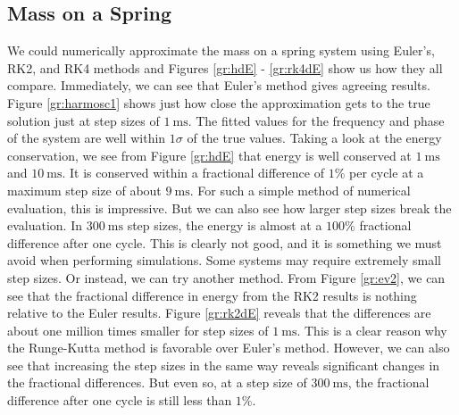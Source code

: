 \documentclass[aps,prl,twocolumn,superscriptaddress]{revtex4-1}
\begin{document}
\subsection{Mass on a Spring}
We could numerically approximate the mass on a spring system using Euler's, RK2, and RK4 methods and Figures \ref{gr:hdE} - \ref{gr:rk4dE} show us how they all compare. Immediately, we can see that Euler's method gives agreeing results. Figure \ref{gr:harmosc1} shows just how close the approximation gets to the true solution just at step sizes of $\SI{1}{\ms}$. The fitted values for the frequency and phase of the system are well within $1\sigma$ of the true values. Taking a look at the energy conservation, we see from Figure \ref{gr:hdE} that energy is well conserved at $\SI{1}{\ms}$ and $\SI{10}{\ms}$. It is conserved within a fractional difference of $1$\% per cycle at a maximum step size of about $\SI{9}{\ms}$. For such a simple method of numerical evaluation, this is impressive. But we can also see how larger step sizes break the evaluation. In $\SI{300}{\ms}$ step sizes, the energy is almost at a $100$\% fractional difference after one cycle. This is clearly not good, and it is something we must avoid when performing simulations. Some systems may require extremely small step sizes. Or instead, we can try another method. 
From Figure \ref{gr:ev2}, we can see that the fractional difference in energy from the RK2 results is nothing relative to the Euler results. Figure \ref{gr:rk2dE} reveals that the differences are about one million times smaller for step sizes of $\SI{1}{\ms}$. This is a clear reason why the Runge-Kutta method is favorable over Euler's method. However, we can also see that increasing the step sizes in the same way reveals significant changes in the fractional differences. But even so, at a step size of $\SI{300}{\ms}$, the fractional difference after one cycle is still less than $1$\%. 
\end{document}
